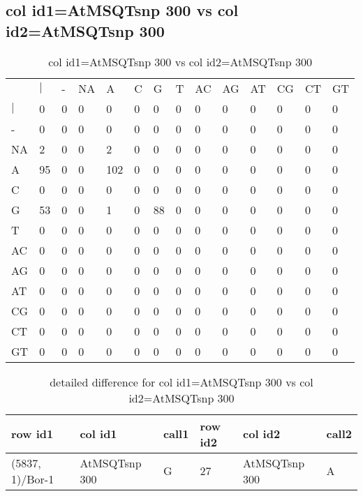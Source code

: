 \subsection{col id1=AtMSQTsnp 300 vs col id2=AtMSQTsnp 300}
\begin{center}
\begin{longtable}{|l|l|l|l|l|l|l|l|l|l|l|l|l|l|}
\caption{col id1=AtMSQTsnp 300 vs col id2=AtMSQTsnp 300} \label{table_dm840}\\
\hline
\\
\hline
&$|$&-&NA&A&C&G&T&AC&AG&AT&CG&CT&GT\\
$|$&0&0&0&0&0&0&0&0&0&0&0&0&0\\
-&0&0&0&0&0&0&0&0&0&0&0&0&0\\
NA&2&0&0&2&0&0&0&0&0&0&0&0&0\\
A&95&0&0&102&0&0&0&0&0&0&0&0&0\\
C&0&0&0&0&0&0&0&0&0&0&0&0&0\\
G&53&0&0&1&0&88&0&0&0&0&0&0&0\\
T&0&0&0&0&0&0&0&0&0&0&0&0&0\\
AC&0&0&0&0&0&0&0&0&0&0&0&0&0\\
AG&0&0&0&0&0&0&0&0&0&0&0&0&0\\
AT&0&0&0&0&0&0&0&0&0&0&0&0&0\\
CG&0&0&0&0&0&0&0&0&0&0&0&0&0\\
CT&0&0&0&0&0&0&0&0&0&0&0&0&0\\
GT&0&0&0&0&0&0&0&0&0&0&0&0&0\\
\hline
\end{longtable}
\end{center}

\begin{center}
\begin{longtable}{|l|l|l|l|l|l|}
\caption{detailed difference for col id1=AtMSQTsnp 300 vs col id2=AtMSQTsnp 300} \label{table_dm841}\\
\hline
row id1&col id1&call1&row id2&col id2&call2\\
\hline
(5837, 1)/Bor-1&AtMSQTsnp 300&G&27&AtMSQTsnp 300&A\\
\hline
\end{longtable}
\end{center}

